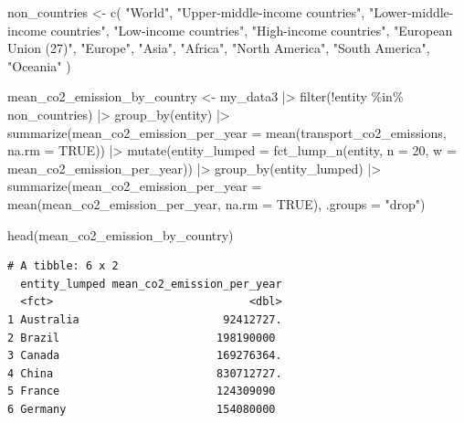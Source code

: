 \documentclass[
  11pt,
  a4paper,
  DIV=11,
  numbers=noendperiod]{scrartcl}
\newenvironment{Shaded}{\begin{snugshade}}{\end{snugshade}}
\newcommand{\AttributeTok}[1]{\textcolor[rgb]{0.40,0.45,0.13}{#1}}
\newcommand{\ConstantTok}[1]{\textcolor[rgb]{0.56,0.35,0.01}{#1}}
\newcommand{\DecValTok}[1]{\textcolor[rgb]{0.68,0.00,0.00}{#1}}
\newcommand{\FunctionTok}[1]{\textcolor[rgb]{0.28,0.35,0.67}{#1}}
\newcommand{\NormalTok}[1]{\textcolor[rgb]{0.00,0.23,0.31}{#1}}
\newcommand{\OtherTok}[1]{\textcolor[rgb]{0.00,0.23,0.31}{#1}}
\newcommand{\SpecialCharTok}[1]{\textcolor[rgb]{0.37,0.37,0.37}{#1}}
\newcommand{\StringTok}[1]{\textcolor[rgb]{0.13,0.47,0.30}{#1}}
\begin{document}
\begin{Shaded}
\begin{Highlighting}[]
\NormalTok{non\_countries }\OtherTok{\textless{}{-}} \FunctionTok{c}\NormalTok{(}
  \StringTok{"World"}\NormalTok{, }
  \StringTok{"Upper{-}middle{-}income countries"}\NormalTok{, }
  \StringTok{"Lower{-}middle{-}income countries"}\NormalTok{, }
  \StringTok{"Low{-}income countries"}\NormalTok{, }
  \StringTok{"High{-}income countries"}\NormalTok{, }
  \StringTok{"European Union (27)"}\NormalTok{, }
  \StringTok{"Europe"}\NormalTok{, }
  \StringTok{"Asia"}\NormalTok{, }
  \StringTok{"Africa"}\NormalTok{,}
  \StringTok{"North America"}\NormalTok{,}
  \StringTok{"South America"}\NormalTok{,}
  \StringTok{"Oceania"}
\NormalTok{)}

\NormalTok{mean\_co2\_emission\_by\_country }\OtherTok{\textless{}{-}}\NormalTok{ my\_data3 }\SpecialCharTok{|\textgreater{}} 
  \FunctionTok{filter}\NormalTok{(}\SpecialCharTok{!}\NormalTok{entity }\SpecialCharTok{\%in\%}\NormalTok{ non\_countries) }\SpecialCharTok{|\textgreater{}}
  \FunctionTok{group\_by}\NormalTok{(entity) }\SpecialCharTok{|\textgreater{}}
  \FunctionTok{summarize}\NormalTok{(}\AttributeTok{mean\_co2\_emission\_per\_year =} \FunctionTok{mean}\NormalTok{(transport\_co2\_emissions,}
                                              \AttributeTok{na.rm =} \ConstantTok{TRUE}\NormalTok{)) }\SpecialCharTok{|\textgreater{}}
  \FunctionTok{mutate}\NormalTok{(}\AttributeTok{entity\_lumped =} \FunctionTok{fct\_lump\_n}\NormalTok{(entity, }\AttributeTok{n =} \DecValTok{20}\NormalTok{,}
                                    \AttributeTok{w =}\NormalTok{ mean\_co2\_emission\_per\_year)) }\SpecialCharTok{|\textgreater{}}
  \FunctionTok{group\_by}\NormalTok{(entity\_lumped) }\SpecialCharTok{|\textgreater{}}
  \FunctionTok{summarize}\NormalTok{(}\AttributeTok{mean\_co2\_emission\_per\_year =} \FunctionTok{mean}\NormalTok{(mean\_co2\_emission\_per\_year,}
                                              \AttributeTok{na.rm =} \ConstantTok{TRUE}\NormalTok{), }\AttributeTok{.groups =} \StringTok{"drop"}\NormalTok{)}

\FunctionTok{head}\NormalTok{(mean\_co2\_emission\_by\_country)}
\end{Highlighting}
\end{Shaded}

\begin{verbatim}
# A tibble: 6 x 2
  entity_lumped mean_co2_emission_per_year
  <fct>                              <dbl>
1 Australia                      92412727.
2 Brazil                        198190000 
3 Canada                        169276364.
4 China                         830712727.
5 France                        124309090 
6 Germany                       154080000 
\end{verbatim}
\end{document}
